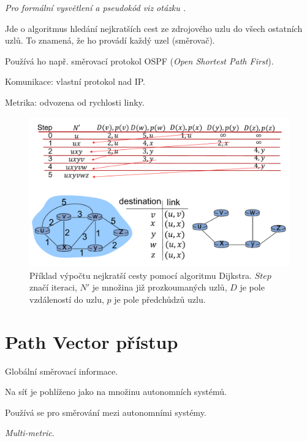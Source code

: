 \begin{compactitem}
    \item \textit{Pro formální vysvětlení a pseudokód viz otázku .}
    \item Jde o algoritmus hledání nejkratších cest ze zdrojového uzlu do všech ostatních uzlů. To znamená, že ho provádí každý uzel (směrovač).
    \item Používá ho např. směrovací protokol OSPF (\textit{Open Shortest Path First}). \begin{compactitem}
        \item Komunikace: vlastní protokol nad IP.
        \item Metrika: odvozena od rychlosti linky.
    \end{compactitem}
\end{compactitem}

\begin{figure}[H]
    \centering
    \includegraphics[width=1\linewidth]{dijkstra_example.pdf}
    \caption{Příklad výpočtu nejkratší cesty pomocí algoritmu Dijkstra. $Step$ značí iteraci, $N'$ je množina již prozkoumaných uzlů, $D$ je pole vzdáleností do uzlu, $p$ je pole předchůdzů uzlu.}
\end{figure}


\section{Path Vector přístup}

\begin{compactitem}
    \item Globální směrovací informace.
    \item Na síť je pohlíženo jako na množinu autonomních systémů.
    \item Používá se pro směrování mezi autonomními systémy.
    \item \textit{Multi-metric}.
\end{compactitem}


